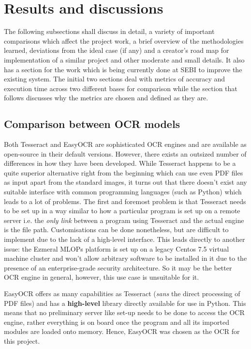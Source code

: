 \chapter{Results and discussions} \label{chapter5}

The following subsections shall discuss in detail, a variety of important comparisons which affect the project work, a brief overview of the methodologies learned, deviations from the ideal case (if any) and a creator’s road map for implementation of a similar project and other moderate and small details. It also has a section for the work which is being currently done at SEBI to improve the existing system. The initial two sections deal with metrics of accuracy and execution time across two different bases for comparison while the section that follows discusses why the metrics are chosen and defined as they are. \par

\section{Comparison between OCR models} \label{comp_ocr}

Both Tesseract and EasyOCR are sophisticated OCR engines and are available as open-source in their default versions. However, there exists an outsized number of differences in how they have been developed. While Tesseract \cite{Google2015} happens to be a quite superior alternative right from the beginning which can use even PDF files as input apart from the standard images, it turns out that there doesn’t exist any suitable interface with common programming languages (such as Python) which leads to a lot of problems. The first and foremost problem is that Tesseract needs to be set up in a way similar to how a particular program is set up on a remote server i.e. the \textit{only link} between a program using Tesseract and the actual engine is the file path. Customisations can be done nonetheless, but are difficult to implement due to the lack of a high-level interface. This leads directly to another issue: the Ezmeral MLOPs platform is set up on a legacy Centos 7.5 virtual machine cluster and won’t allow arbitrary software to be installed in it due to the presence of an enterprise-grade security architecture.  So it may be the better OCR engine in general, however, this use case is unsuitable for it.\par

EasyOCR offers as many capabilities \cite{Jaided2020} as Tesseract (\textit{sans} the direct processing of PDF files) and has a \textbf{high-level} library directly available for use in Python. This means that no preliminary server like set-up needs to be done to access the OCR engine, rather everything is on board once the program and all its imported modules are loaded onto memory. Hence, EasyOCR was chosen as the OCR for this project. \par

